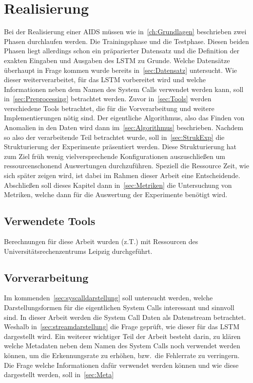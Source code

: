
\chapter{Realisierung}\label{ch:Realisierung}
    Bei der Realisierung einer AIDS müssen wie in~\autoref{ch:Grundlagen} beschrieben zwei Phasen durchlaufen werden.
    Die Trainingsphase und die Testphase.
    Diesen beiden Phasen liegt allerdings schon ein präparierter Datensatz und die Definition der exakten Eingaben und Ausgaben des \ac{LSTM} zu Grunde. 
    Welche Datensätze überhaupt in Frage kommen wurde bereits in~\autoref{sec:Datensatz} untersucht.
    Wie dieser weiterverarbeitet, für das \ac{LSTM} vorbereitet wird und welche Informationen neben dem Namen des System Calls verwendet werden kann, 
    soll in~\autoref{sec:Preprocessing} betrachtet werden.
    Zuvor in~\autoref{sec:Tools} werden verschiedene Tools betrachtet, die für die Vorverarbeitung und weitere Implementierungen nötig sind.
    Der eigentliche Algorithmus, also das Finden von Anomalien in den Daten wird dann im~\autoref{sec:Algorithmus} beschrieben.
    Nachdem so also der verarbeitende Teil betrachtet wurde, soll in~\autoref{sec:StrukExp} die Strukturierung der Experimente präsentiert werden.
    Diese Strukturierung hat zum Ziel früh wenig vielversprechende Konfigurationen auszuschließen um ressourcenschonend Auswertungen durchzuführen.
    Speziell die Ressource Zeit, wie sich später zeigen wird, ist dabei im Rahmen dieser Arbeit eine Entscheidende.
    Abschließen soll dieses Kapitel dann in~\autoref{sec:Metriken} die Untersuchung von Metriken, welche dann für die Auswertung der Experimente benötigt wird.

    \section{Verwendete Tools}\label{sec:Tools}
        Berechnungen für diese Arbeit wurden (z.T.) mit Ressourcen des Universitätsrechenzentrums Leipzig durchgeführt.

    \section{Vorverarbeitung}\label{sec:Preprocessing}
        Im kommenden~\autoref{sec:syscalldarstellung} soll untersucht werden, welche Darstellungsformen für die eigentlichen System Calls interessant und sinnvoll sind.
        In dieser Arbeit werden die System Call Daten als Datenstream betrachtet.
        Weshalb in~\autoref{sec:streamdarstellung} die Frage geprüft, wie dieser für das \ac{LSTM} dargestellt wird.
        Ein weiterer wichtiger Teil der Arbeit besteht darin, zu klären welche Metadaten neben dem Namen des System Calls noch verwendet werden können,
        um die Erkennungsrate zu erhöhen, bzw.\ die Fehlerrate zu verringern.
        Die Frage welche Informationen dafür verwendet werden können und wie diese dargestellt werden, soll in~\autoref{sec:Meta}

